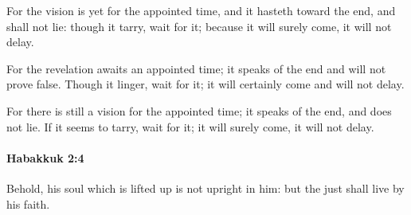 			\begin{versebox}
					\item[BHS] 
					\item[LXX] 
					\item[ASV] For the vision is yet for the appointed time, and it hasteth toward the end, and shall not lie: though it tarry, wait for it; because it will surely come, it will not delay.
					\item[NIV] For the revelation awaits an appointed time; it speaks of the end and will not prove false. Though it linger, wait for it; it will certainly come and will not delay.
					\item[NRSV] For there is still a vision for the appointed time; it speaks of the end, and does not lie. If it seems to tarry, wait for it; it will surely come, it will not delay.
			\end{versebox}

		\paragraph{Habakkuk 2:4} %
			\label{HABAKKUK-2-4}

			Behold, his soul which is lifted up is not upright in him: but the just shall live by his faith.

